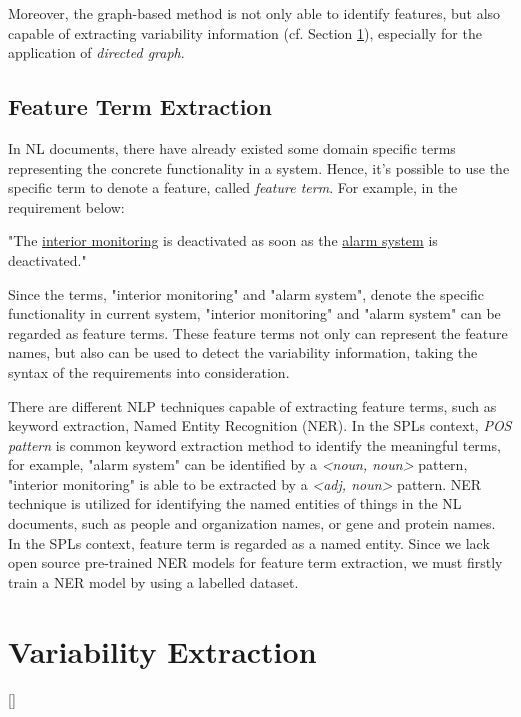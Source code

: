 \documentclass[graybox]{svmult}
\newcommand{\todo}[1]{{\color{red} [#1]}}
\begin{document}
Moreover, the graph-based method is not only able to identify features, but also capable of extracting variability information (cf. Section \ref{sec:variability}), especially for the application of \textit{directed graph}.




\subsection{Feature Term Extraction}
In NL documents, there have already existed some domain specific terms representing the concrete functionality in a system. Hence, it's possible to use the specific term to denote a feature, called \textit{feature term}.
For example, in the requirement below:
\begin{shaded}
"The \underline{interior monitoring} is deactivated as soon as the \underline{alarm system} is deactivated."
\end{shaded}
Since the terms, "interior monitoring" and "alarm system", denote the specific functionality in current system, "interior monitoring" and "alarm system" can be regarded as feature terms. These feature terms not only can represent the feature names, but also can be used to detect the variability information, taking the syntax of the requirements into consideration. 

There are different NLP techniques capable of extracting feature terms, such as keyword extraction, Named Entity Recognition (NER). In the SPLs context, \textit{POS pattern} is common keyword extraction method to identify the meaningful terms, for example, "alarm system" can be identified by a \textit{<noun, noun>} pattern, "interior monitoring" is able to be extracted by a \textit{<adj, noun>} pattern. NER technique is utilized for identifying the named entities of things in the NL documents, such as people and organization names, or gene and protein names. In the SPLs context, feature term is regarded as a named entity. Since we lack open source pre-trained NER models for feature term extraction, we must firstly train a NER model by using a labelled dataset. 




\section{Variability Extraction}
\label{sec:variability}
\todo{}
\end{document}
